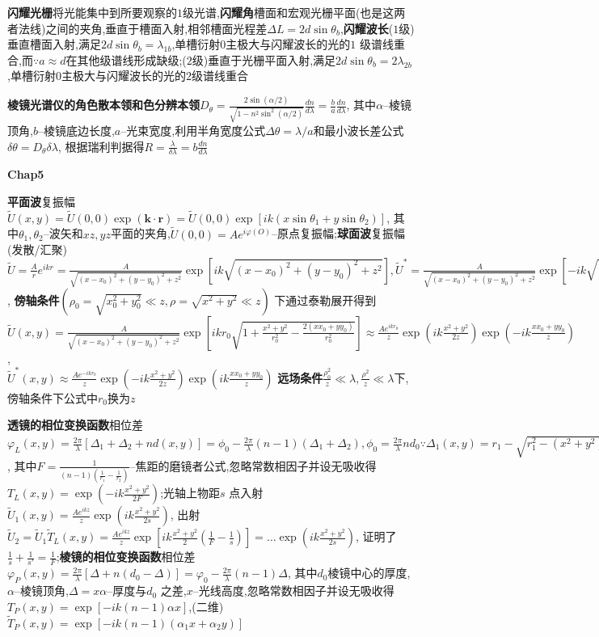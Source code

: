 \documentclass[10pt,a4paper]{article}
\begin{document}
\textbf{闪耀光栅}将光能集中到所要观察的$1$级光谱,\textbf{闪耀角}槽面和宏观光栅平面(也是这两者法线)之间的夹角,垂直于槽面入射,相邻槽面光程差$\Delta L=2d\sin\theta_b$,\textbf{闪耀波长}($1$级)垂直槽面入射,满足$2d\sin\theta_b=\lambda_{1b}$,单槽衍射$0$主极大与闪耀波长的光的$1$ 级谱线重合,而$\because a\approx d$在其他级谱线形成缺级;($2$级)垂直于光栅平面入射,满足$2d\sin\theta_b=2\lambda_{2b}$,单槽衍射$0$主极大与闪耀波长的光的$2$级谱线重合

\textbf{棱镜光谱仪的角色散本领和色分辨本领}$D_{\theta}=\frac{2\sin(\alpha/2)}{\sqrt{1-n^2\sin^2(\alpha/2)}}\frac{dn}{d\lambda}=\frac{b}{a}\frac{dn}{d\lambda}$, 其中$\alpha$--棱镜顶角,$b$--棱镜底边长度,$a$--光束宽度,利用半角宽度公式$\Delta\theta=\lambda/a$和最小波长差公式$\delta\theta=D_{\theta}\delta\lambda$, 根据瑞利判据得$R=\frac{\lambda}{\delta\lambda}=b\frac{dn}{d\lambda}$

\textbf{Chap5}

\textbf{平面波}复振幅$\widetilde{U}(x,y)=\widetilde{U}(0,0)\exp(\bm{k}\cdot\bm{r})=\widetilde{U}(0,0)\exp[ik(x\sin\theta_1+y\sin\theta_2)]$, 其中$\theta_1,\theta_2$--波矢和$xz,yz$平面的夹角,$\widetilde{U}(0,0)=Ae^{i\varphi(O)}$--原点复振幅;\textbf{球面波}复振幅(发散/汇聚)\\$\widetilde{U}=\frac{A}{r}e^{ikr}=\frac{A}{\sqrt{(x-x_0)^2+(y-y_0)^2+z^2}}\exp[ik\sqrt{(x-x_0)^2+(y-y_0)^2+z^2}],\widetilde{U}^*=\frac{A}{\sqrt{(x-x_0)^2+(y-y_0)^2+z^2}}\exp[-ik\sqrt{(x-x_0)^2+(y-y_0)^2+z^2}]$, \textbf{傍轴条件}$(\rho_0=\sqrt{x_0^2+y_0^2}\ll z,\rho=\sqrt{x^2+y^2}\ll z)$ 下通过泰勒展开得到$\widetilde{U}(x,y)=\frac{A}{\sqrt{(x-x_0)^2+(y-y_0)^2+z^2}}\exp[ikr_0\sqrt{1+\frac{x^2+y^2}{r_0^2}-\frac{2(xx_0+yy_0)}{r_0^2}}]\approx\frac{Ae^{ikr_0}}{z}\exp(ik\frac{x^2+y^2}{2z})\exp(-ik\frac{xx_0+yy_0}{z})$,\\$\widetilde{U}^*(x,y)\approx\frac{Ae^{-ikr_0}}{z}\exp(-ik\frac{x^2+y^2}{2z})\exp(ik\frac{xx_0+yy_0}{z})$
\textbf{远场条件}$\frac{\rho_0^2}{z}\ll\lambda,\frac{\rho^2}{z}\ll\lambda$下,傍轴条件下公式中$r_0$换为$z$

\textbf{透镜的相位变换函数}相位差$\varphi_L(x,y)=\frac{2\pi}{\lambda}[\Delta_1+\Delta_2+nd(x,y)]=\phi_0-\frac{2\pi}{\lambda}(n-1)(\Delta_1+\Delta_2),\phi_0=\frac{2\pi}{\lambda}nd_0\because\Delta_1(x,y)=r_1-\sqrt{r_1^2-(x^2+y^2)}\approx=\frac{x^2+y^2}{2r_1},\Delta_2=-\frac{x^2+y^2}{2r_2}\Longrightarrow\varphi_L(x,y)=\phi_0-\frac{2\pi}{\lambda}\frac{n-1}{2}(\frac{1}{r_1}-\frac{1}{r_2})(x^2+y^2)=\varphi_0-k\frac{x^2+y^2}{2F}$, 其中$F=\frac{1}{(n-1)(\frac{1}{r_1}-\frac{1}{r_2})}$--焦距的磨镜者公式,忽略常数相因子并设无吸收得$T_L(x,y)=\exp(-ik\frac{x^2+y^2}{2F})$;光轴上物距$s$ 点入射$\widetilde{U}_1(x,y)=\frac{Ae^{ikz}}{z}\exp(ik\frac{x^2+y^2}{2s})$, 出射$\widetilde{U}_2=\widetilde{U}_1\widetilde{T}_L(x,y)=\frac{Ae^{ikz}}{z}\exp[ik\frac{x^2+y^2}{2}(\frac{1}{F}-\frac{1}{s})]=\ldots\exp(ik\frac{x^2+y^2}{2s})$, 证明了$\frac{1}{s}+\frac{1}{s'}=\frac{1}{F}$;\textbf{棱镜的相位变换函数}相位差$\varphi_P(x,y)=\frac{2\pi}{\lambda}[\Delta+n(d_0-\Delta)]=\varphi_0-\frac{2\pi}{\lambda}(n-1)\Delta$, 其中$d_0$棱镜中心的厚度,$\alpha$--棱镜顶角,$\Delta=x\alpha$--厚度与$d_0$ 之差,$x$--光线高度,忽略常数相因子并设无吸收得$T_P(x,y)=\exp[-ik(n-1)\alpha x]$,(二维)$\widetilde{T}_P(x,y)=\exp[-ik(n-1)(\alpha_1x+\alpha_2y)]$
\end{document}
